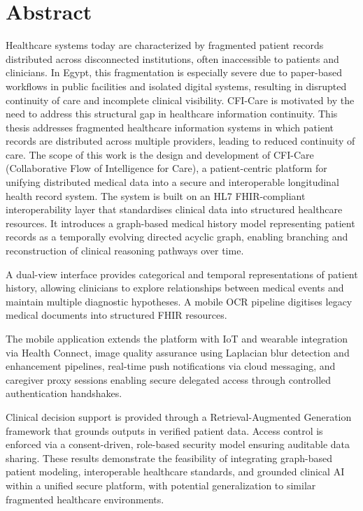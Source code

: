 \chapter*{Abstract}
\label{chap:abstract}
Healthcare systems today are characterized by fragmented patient records distributed across disconnected institutions, often inaccessible to patients and clinicians. In Egypt, this fragmentation is especially severe due to paper-based workflows in public facilities and isolated digital systems, resulting in disrupted continuity of care and incomplete clinical visibility. CFI-Care is motivated by the need to address this structural gap in healthcare information continuity.
This thesis addresses fragmented healthcare information systems in which patient records are distributed across multiple providers, leading to reduced continuity of care. The scope of this work is the design and development of CFI-Care (Collaborative Flow of Intelligence for Care), a patient-centric platform for unifying distributed medical data into a secure and interoperable longitudinal health record system.
The system is built on an HL7 FHIR-compliant interoperability layer that standardises clinical data into structured healthcare resources. It introduces a graph-based medical history model representing patient records as a temporally evolving directed acyclic graph, enabling branching and reconstruction of clinical reasoning pathways over time.

A dual-view interface provides categorical and temporal representations of patient history, allowing clinicians to explore relationships between medical events and maintain multiple diagnostic hypotheses. A mobile OCR pipeline digitises legacy medical documents into structured FHIR resources.

The mobile application extends the platform with IoT and wearable integration via Health Connect, image quality assurance using Laplacian blur detection and enhancement pipelines, real-time push notifications via cloud messaging, and caregiver proxy sessions enabling secure delegated access through controlled authentication handshakes.

Clinical decision support is provided through a Retrieval-Augmented Generation framework that grounds outputs in verified patient data. Access control is enforced via a consent-driven, role-based security model ensuring auditable data sharing.
These results demonstrate the feasibility of integrating graph-based patient modeling, interoperable healthcare standards, and grounded clinical AI within a unified secure platform, with potential generalization to similar fragmented healthcare environments.
